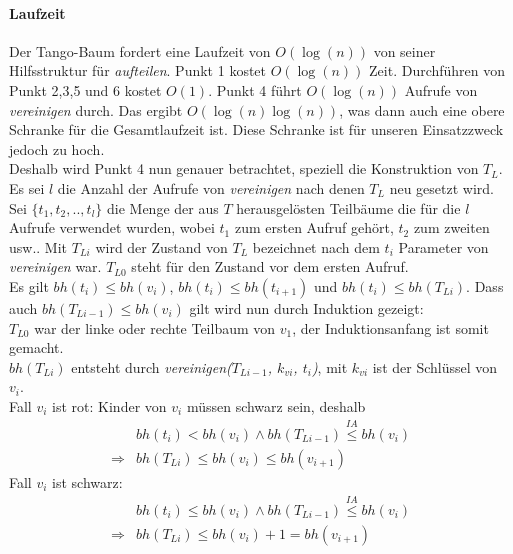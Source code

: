 \documentclass[a4paper,12pt]{article}
\begin{document}
\paragraph{Laufzeit}
Der Tango-Baum fordert eine Laufzeit von $O(\log(n))$ von seiner Hilfsstruktur für \textit{aufteilen}. Punkt 1 kostet $O(\log(n))$ Zeit. Durchführen von Punkt 2,3,5 und 6 kostet $O(1)$. Punkt 4 führt $O(\log (n))$ Aufrufe von \textit{vereinigen} durch. Das ergibt $O(\log (n) \log (n))$, was dann auch eine obere Schranke für die Gesamtlaufzeit ist. Diese Schranke ist für unseren Einsatzzweck jedoch zu hoch.\\ Deshalb wird Punkt 4 nun genauer betrachtet, speziell die Konstruktion von $T_L$. Es sei $l$ die Anzahl der Aufrufe von \textit{vereinigen} nach denen $T_L$ neu gesetzt wird. Sei $\{t_1,t_2,..,t_l\}$ die Menge der aus $T$ herausgelösten Teilbäume die für die $l$ Aufrufe verwendet wurden, wobei $t_1$ zum ersten Aufruf gehört, $t_2$ zum zweiten usw.. Mit $T_{Li}$ wird der Zustand von $T_L$ bezeichnet nach dem $t_i$ Parameter von \textit{vereinigen} war.  $T_{L0}$ steht für den Zustand vor dem ersten Aufruf.\\

 \noindent Es gilt $\mathit{bh}(t_i) \leq \mathit{bh}(v_i)$, $\mathit{bh}(t_i) \leq \mathit{bh}(t_{i+1}) $ und $\mathit{bh}(t_i) \leq \mathit{bh}(T_{Li})$. Dass auch $\mathit{bh}(T_{Li-1}) \leq \mathit{bh}(v_{i})$ gilt wird nun durch Induktion gezeigt:\\
 $T_{L0}$ war der linke oder rechte Teilbaum von $v_1$, der Induktionsanfang ist somit gemacht.\\
 $\mathit{bh}(T_{Li})$ entsteht durch \textit{vereinigen($T_{Li-1}$, $k_{vi}$, $t_i$)}, mit $k_{vi}$ ist der Schlüssel von~ $v_i$.\\ 
  Fall $v_i$ ist rot:
  Kinder von $v_i$ müssen schwarz sein, deshalb\\
\begin{align*}
&\mathit{bh}(t_i) < \mathit{bh}(v_i)  \land  \mathit{bh}(T_{Li-1})  \overset{\textit{IA}}{\leq}  \mathit{bh}(v_{i}) \\
\Rightarrow  & \mathit{bh}(T_{Li})  \leq  \mathit{bh}(v_{i}) \leq  \mathit{bh}(v_{i+1}) 
\end{align*}
  Fall $v_i$ ist schwarz:
 \begin{align*}
  &\mathit{bh}(t_i) \leq \mathit{bh}(v_i)  \land  \mathit{bh}(T_{Li-1})  \overset{\textit{IA}}{\leq}  \mathit{bh}(v_{i}) \\
  \Rightarrow  &\mathit{bh}(T_{Li})  \leq \mathit{bh}(v_{i}) + 1 =    \mathit{bh}(v_{i+1})
\end{align*}
 
\end{document}
